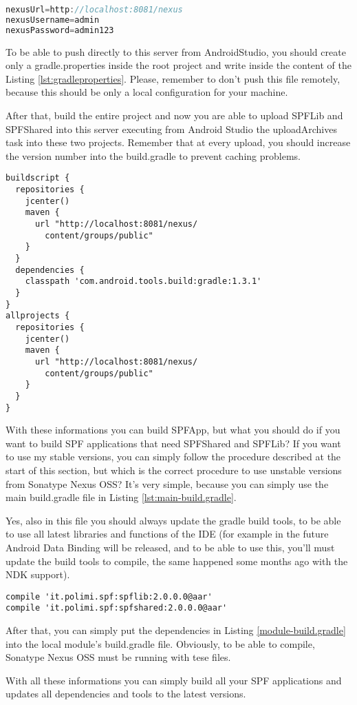 \begin{lstlisting}[caption={gradle.properties},label=lst:gradleproperties, language=Java]
nexusUrl=http://localhost:8081/nexus
nexusUsername=admin
nexusPassword=admin123
\end{lstlisting}


To be able to push directly to this server from AndroidStudio, you should create only a \textsf{gradle.properties} inside the root project and write inside the content of the Listing \ref{lst:gradleproperties}. Please, remember to don't push this file remotely, because this should be only a local configuration for your machine.

After that, build the entire project and now you are able to upload SPFLib and SPFShared into this server executing from Android Studio the uploadArchives task into these two projects. Remember that at every upload, you should increase the version number into the \textsf{build.gradle} to prevent caching problems.

\begin{lstlisting}[caption={Main build.gradle},label=lst:main-build.gradle]
buildscript {
  repositories {
    jcenter()
    maven {
      url "http://localhost:8081/nexus/
      	content/groups/public"
    }
  }
  dependencies {
    classpath 'com.android.tools.build:gradle:1.3.1'
  }
}
allprojects {
  repositories {
    jcenter()
    maven {
      url "http://localhost:8081/nexus/
		content/groups/public"
    }
  }
}
\end{lstlisting}

With these informations you can build \textsf{SPFApp}, but what you should do if you want to build SPF applications that need SPFShared and SPFLib?
If you want to use my stable versions, you can simply follow the procedure described at the start of this section, but which is the correct procedure to use unstable versions from Sonatype Nexus OSS?
It's very simple, because you can simply use the main \textsf{build.gradle} file in Listing \ref{lst:main-build.gradle}.

Yes, also in this file you should always update the gradle build tools, to be able to use all latest libraries and functions of the IDE (for example in the future Android Data Binding will be released, and to be able to use this, you'll must update the build tools to compile, the same happened some months ago with the NDK support).

\begin{lstlisting}[caption={Module build.gradle's example},label=lst:module-build.gradle]
compile 'it.polimi.spf:spflib:2.0.0.0@aar'
compile 'it.polimi.spf:spfshared:2.0.0.0@aar'
\end{lstlisting}

After that, you can simply put the dependencies in Listing \ref{module-build.gradle} into the local module's \textsf{build.gradle} file. Obviously, to be able to compile, Sonatype Nexus OSS must be running with tese files. 

With all these informations you can simply build all your SPF applications and updates all dependencies and tools to the latest versions.



